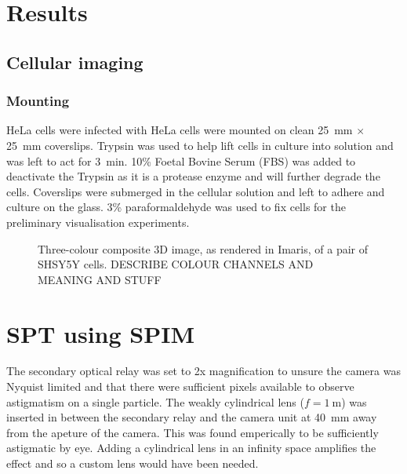 
\section{Results}

\subsection{Cellular imaging}
\subsubsection{Mounting}
HeLa cells were infected with
HeLa cells were mounted on clean \SI{25}{\milli\metre} $\times$ \SI{25}{\milli\metre} coverslips.
Trypsin was used to help lift cells in culture into solution and was left to act for \SI{3}{\minute}.
10\% Foetal Bovine Serum (FBS) was added to deactivate the Trypsin as it is a protease enzyme and will further degrade the cells.
Coverslips were submerged in the cellular solution and left to adhere and culture on the glass.
3\% paraformaldehyde was used to fix cells for the preliminary visualisation experiments.

\begin{figure}
  \centering
  \caption{Three-colour composite 3D image, as rendered in Imaris, of a pair of SHSY5Y cells.
          DESCRIBE COLOUR CHANNELS AND MEANING AND STUFF}
  \label{}
\end{figure}


\section{SPT using SPIM}

The secondary optical relay was set to 2x magnification to unsure the camera was Nyquist limited and that there were sufficient pixels available to observe astigmatism on a single particle.
The weakly cylindrical lens ($f = \SI{1}{\metre}$) was inserted in between the secondary relay and the camera unit at \SI{40}{\milli\metre} away from the apeture of the camera.
This was found emperically to be sufficiently astigmatic by eye.
Adding a cylindrical lens in an infinity space amplifies the effect and so a custom lens would have been needed.

